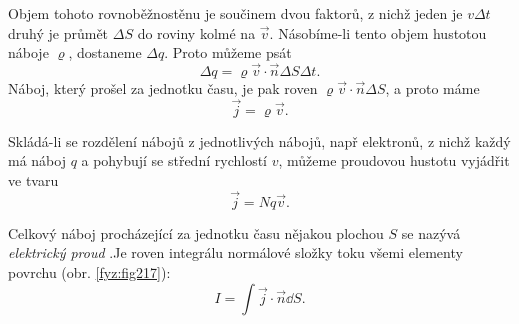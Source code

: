       Objem tohoto rovnoběžnostěnu je součinem dvou faktorů, z nichž jeden je \(v\Delta t\) druhý 
      je průmět \(\Delta S\) do roviny kolmé na \(\vec{v}\). Násobíme-li tento objem hustotou 
      náboje \(\varrho\), dostaneme \(\Delta q\). Proto můžeme psát
      \begin{equation}\label{eq_fyz:mag002}
        \Delta q = \varrho\vec{v}\cdot\vec{n}\Delta S\Delta t.
      \end{equation}
      Náboj, který prošel za jednotku času, je pak roven \(\varrho\vec{v}\cdot\vec{n}\Delta S\), a 
      proto máme
      \begin{equation}\label{eq_fyz:mag003}
        \vec{j} = \varrho\vec{v}.
      \end{equation}
      
      Skládá-li se rozdělení nábojů z jednotlivých nábojů, např elektronů, z nichž každý má náboj 
      \(q\) a pohybují se střední rychlostí \(v\), můžeme proudovou hustotu vyjádřit ve tvaru
      \begin{equation}\label{eq_fyz:mag004}
        \vec{j} = Nq\vec{v}.
      \end{equation}
      
      Celkový náboj procházející za jednotku času nějakou plochou \(S\) se nazývá \emph{elektrický 
      proud} .Je roven integrálu normálové složky toku všemi elementy povrchu (obr. 
      \ref{fyz:fig217}):
      \begin{equation}\label{eq_fyz:mag005}
        I = \int\vec{j}\cdot\vec{n}\dd{S}.
      \end{equation}
    
